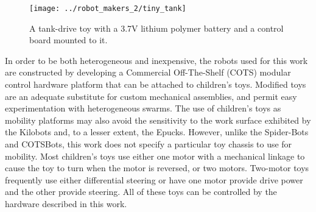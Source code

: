 
\begin{figure}
\centering
\texttt{[image: ../robot\_makers\_2/tiny\_tank]}
\caption{A tank-drive toy with a 3.7V lithium polymer battery and a control board mounted to it.}
\end{figure}

In order to be both heterogeneous and inexpensive, the robots used for this work are constructed by developing a Commercial Off-The-Shelf (COTS) modular control hardware platform that can be attached to children's toys. 
Modified toys are an adequate substitute for custom mechanical assemblies, and permit easy experimentation with heterogeneous swarms. 
The use of children's toys as mobility platforms may also avoid the sensitivity to the work surface exhibited by the Kilobots and, to a lesser extent, the Epucks.
However, unlike the Spider-Bots and COTSBots, this work does not specify a particular toy chassis to use for mobility. 
Most children's toys use either one motor with a mechanical linkage to cause the toy to turn when the motor is reversed, or two motors.
Two-motor toys frequently use either differential steering or have one motor provide drive power and the other provide steering. 
All of these toys can be controlled by the hardware described in this work. 

